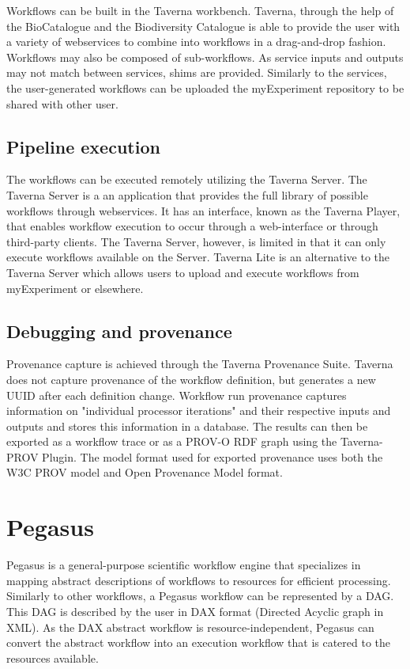 \documentclass{report}
\begin{document}
        Workflows can be built in the Taverna workbench. Taverna, through the
        help of the BioCatalogue and the Biodiversity Catalogue is able to
        provide the user with a variety of webservices to combine into workflows
        in a drag-and-drop fashion. Workflows may also be composed of
        sub-workflows. As service inputs and outputs may not match between
        services, shims are provided.  Similarly to the services, the
        user-generated workflows can be uploaded the myExperiment repository to
        be shared with other user.
        
        \subsection{Pipeline execution} The workflows can be executed remotely
        utilizing the Taverna Server. The Taverna Server is a an application
        that provides the full library of possible workflows through
        webservices. It has an interface, known as the Taverna Player, that
        enables workflow execution to occur through a web-interface or through
        third-party clients. The Taverna Server, however, is limited in that it
        can only execute workflows available on the Server. Taverna Lite is an
        alternative to the Taverna Server which allows users to upload and
        execute workflows from myExperiment or elsewhere.   
        
        \subsection{Debugging and provenance} Provenance capture is achieved
        through the Taverna Provenance Suite. Taverna does not capture
        provenance of the workflow definition, but generates a new UUID after
        each definition change. Workflow run provenance captures information on
        "individual processor iterations" and their respective inputs and
        outputs and stores this information in a database. The results can then
        be exported as a workflow trace or as a PROV-O RDF graph using the
        Taverna-PROV Plugin. The model format used for exported provenance uses
        both the W3C PROV model and Open Provenance Model format.
        
    \section{Pegasus} Pegasus is a general-purpose scientific workflow engine
    that specializes in mapping abstract descriptions of workflows to resources
    for efficient processing.  Similarly to other workflows, a Pegasus workflow
    can be represented by a DAG. This DAG is described by the user in DAX format
    (Directed Acyclic graph in XML).  As the DAX abstract workflow is
    resource-independent, Pegasus can convert the abstract workflow into an
    execution workflow that is catered to the resources available.        
\end{document}
